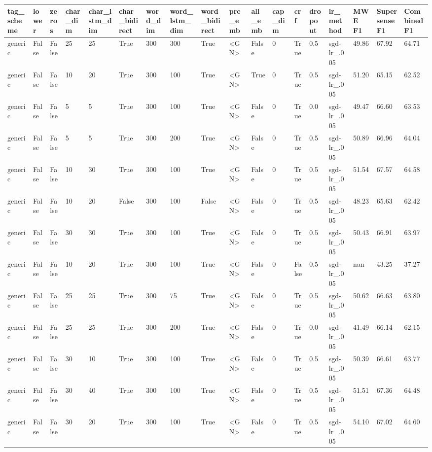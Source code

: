 \begin{adjustbox}{rotate=90,height=\textheight,width=\textwidth}\label{tab:all602020optimisationtestsgn}
\tiny
\begin{tabular}{llllllllllllllllll}
tag\_scheme & lower & zeros & char\_dim & char\_lstm\_dim & char\_bidirect & word\_dim & word\_lstm\_dim & word\_bidirect & pre\_emb & all\_emb & cap\_dim & crf & dropout & lr\_method & MWE F1 &  Supersense F1 &  Combined F1\\
\hline
generic & False & False & 25 & 25 & True & 300 & 300 & True & <GN> & False & 0 & True & 0.5 & sgd-lr\_.005 & 49.86 & 67.92 & 64.71\\
generic & False & False & 10 & 20 & True & 300 & 100 & True & <GN> & True & 0 & True & 0.5 & sgd-lr\_.005 & 51.20 & 65.15 & 62.52\\
generic & False & False & 5 & 5 & True & 300 & 100 & True & <GN> & False & 0 & True & 0.0 & sgd-lr\_.005 & 49.47 & 66.60 & 63.53\\
generic & False & False & 5 & 5 & True & 300 & 200 & True & <GN> & False & 0 & True & 0.5 & sgd-lr\_.005 & 50.89 & 66.96 & 64.04\\
generic & False & False & 10 & 30 & True & 300 & 100 & True & <GN> & False & 0 & True & 0.5 & sgd-lr\_.005 & 51.54 & 67.57 & 64.58\\
generic & False & False & 10 & 20 & False & 300 & 100 & False & <GN> & False & 0 & True & 0.5 & sgd-lr\_.005 & 48.23 & 65.63 & 62.42\\
generic & False & False & 30 & 30 & True & 300 & 100 & True & <GN> & False & 0 & True & 0.5 & sgd-lr\_.005 & 50.43 & 66.91 & 63.97\\
generic & False & False & 10 & 20 & True & 300 & 100 & True & <GN> & False & 0 & False & 0.5 & sgd-lr\_.005 & nan & 43.25 & 37.27\\
generic & False & False & 25 & 25 & True & 300 & 75 & True & <GN> & False & 0 & True & 0.5 & sgd-lr\_.005 & 50.62 & 66.63 & 63.80\\
generic & False & False & 25 & 25 & True & 300 & 200 & True & <GN> & False & 0 & True & 0.0 & sgd-lr\_.005 & 41.49 & 66.14 & 62.15\\
generic & False & False & 30 & 10 & True & 300 & 100 & True & <GN> & False & 0 & True & 0.5 & sgd-lr\_.005 & 50.39 & 66.61 & 63.77\\
generic & False & False & 30 & 40 & True & 300 & 100 & True & <GN> & False & 0 & True & 0.5 & sgd-lr\_.005 & 51.51 & 67.36 & 64.48\\
generic & False & False & 30 & 20 & True & 300 & 100 & True & <GN> & False & 0 & True & 0.5 & sgd-lr\_.005 & 54.10 & 67.02 & 64.60\\

\end{tabular}
\end{adjustbox}
